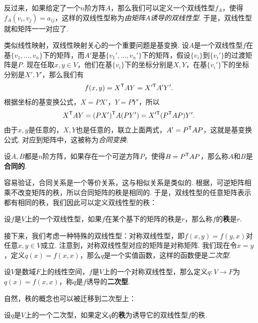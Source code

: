 反过来，如果给定了一个$n$阶方阵$A$，那么我们可以定义一个双线性型$f_A$，使得$f_A(v_i,v_j)=a_{ij}$，这样的双线性型称为\textit{由矩阵$A$诱导的双线性型}. 于是，双线性型就和矩阵一一对应了. 

类似线性映射，双线性映射关心的一个重要问题是基变换. 设$A$是一个双线性型$f$在基$\{v_1,\dots,v_n\}$下的矩阵，而$A'$是基$\{v_1',\dots,v_n'\}$下的矩阵，假设$\{v_i\}$到$\{v_i'\}$的过渡矩阵是$P$. 现在任取$x,y\in V$，他们在基$\{v_i\}$下的坐标分别是$X,Y$，在基$\{v_i'\}$下的坐标分别是$X',Y'$，那么我们有
\[
    f(x,y)=X^{\mathsf{T}} AY=X'^{\mathsf{T}} A'Y'.
\]
根据坐标的基变换公式，$X=PX'$，$Y=PY'$，所以
\[
    X^{\mathsf{T}} AY=(PX')^{\mathsf{T}} A(PY')=X'^{\mathsf{T}} (P^{\mathsf{T}} A P)Y'.
\]
由于$x,y$是任意的，$X,Y$也是任意的，联立上面两式，$A'=P^{\mathsf{T}} A P$，这就是基变换公式. 对应到矩阵中，这被称为\textit{合同变换}. 

\begin{definition}[合同矩阵]\label{definition:congruent-matrix}
    设$A,B$都是$n$阶方阵，如果存在一个可逆方阵$P$，使得$B=P^{\mathsf{T}} A P$，那么称$A$和$B$是\textbf{合同的}. 
\end{definition}

容易验证，合同关系是一个等价关系，这与相似关系是类似的. 根据，可逆矩阵相乘不改变矩阵的秩，所以合同矩阵的秩是相同的. 于是，双线性型的任意矩阵表示都有相同的秩，我们因此可以定义双线性型的秩：

\begin{definition}[双线性型的秩]\label{definition:bilinear-form-rank}
    设$f$是$V$上的一个双线性型，如果$f$在某个基下的矩阵的秩是$r$，那么称$f$的\textbf{秩}是$r$.
\end{definition}

接下来，我们考虑一种特殊的双线性型：对称双线性型，即$f(x,y)=f(y,x)$对任意$x,y\in V$成立. 注意到，对称双线性型对应的矩阵是对称矩阵. 我们现在令$x=y$，定义$q(x)=f(x,x)$，那么$q$是一个实值函数，这样的函数便是\textit{二次型}. 

\begin{definition}[二次型]\label{definition:quadratic-form}
    设$V$是数域$F$上的线性空间，$f$是$V$上的一个对称双线性型，那么定义$q:V\to F$为$q(x)=f(x,x)$，称$q$是$f$诱导的\textbf{二次型}. 
\end{definition}

自然，秩的概念也可以被迁移到二次型上：
\begin{definition}[二次型的秩]\label{definition:quadratic-form-rank}
设$q$是$V$上的一个二次型，如果定义$q$的\textbf{秩}为诱导它的双线性型$f$的秩. 
\end{definition}

